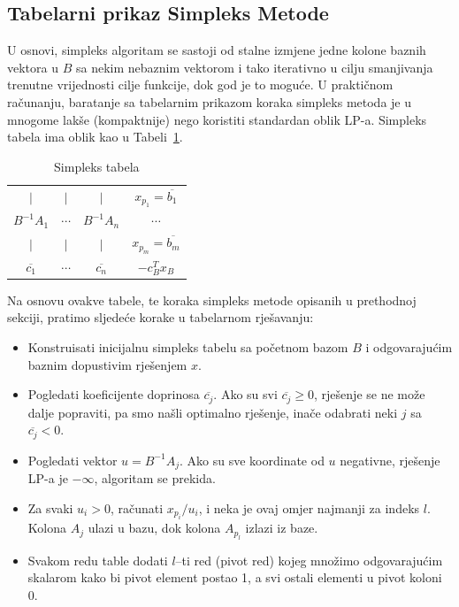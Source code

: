 \documentclass[a4paper, utf8, 11pt, colorlinks]{article}
\begin{document}
\subsection{Tabelarni prikaz Simpleks Metode}

U osnovi, simpleks algoritam se sastoji od stalne izmjene jedne kolone baznih vektora u $B$ sa nekim nebaznim vektorom i tako iterativno u cilju smanjivanja trenutne vrijednosti cilje funkcije, dok god je to moguće. 
U praktičnom računanju, baratanje sa tabelarnim prikazom koraka simpleks metoda je u mnogome lakše (kompaktnije) nego koristiti standardan oblik LP-a. 
Simpleks tabela ima oblik kao u Tabeli~\ref{tab:simplex_tabelau}. 

\begin{table}[!ht]
    \centering
    \begin{tabular}{c c c | c} \\ \hline
            $\mid$          &       $\mid$ &  $\mid$             &    $x_{p_1} = \overline{b_1}$         \\
          $B^{-1}A_1$       &    $\cdots$    &  $B^{-1}A_n$      &    $\cdots$          \\
            $\mid$          &       $\mid$ &  $\mid$             &   $ x_{p_m} = \overline{b_m}$         \\ \hline
          $\overline{c_1}$  &    $\cdots$    & $\overline{c_n}$  &  $-c^T_B x_B$         \\ \hline
    \end{tabular}
    \caption{Simpleks tabela}
    \label{tab:simplex_tabelau}
\end{table}

Na osnovu ovakve tabele, te koraka simpleks metode opisanih u prethodnoj sekciji, pratimo sljedeće korake u tabelarnom rješavanju:
\begin{itemize}
    \item Konstruisati inicijalnu simpleks tabelu sa početnom bazom $B$ i odgovarajućim baznim dopustivim rješenjem $x$.
    \item Pogledati koeficijente doprinosa $\overline{c_j}$. Ako su svi $\overline{c_j} \geq 0$, rješenje se ne može dalje popraviti, pa smo našli optimalno rješenje, inače odabrati neki $j$ sa $\overline{c_j}<0$.
    \item Pogledati vektor $u = B^{-1}A_j$. Ako su sve koordinate od $u$ negativne, rješenje LP-a je $-\infty$, algoritam se prekida.
    \item Za svaki $u_i > 0$, računati $x_{p_i}/u_i$, i neka je ovaj omjer najmanji za indeks $l$. Kolona $A_{j}$ ulazi u bazu, dok kolona $A_{p_l}$ izlazi iz baze. 
    \item Svakom redu table dodati $l$--ti red (pivot red) kojeg množimo odgovarajućim
         skalarom kako bi pivot element postao 1, a svi ostali elementi u pivot koloni 0.
\end{itemize}
\end{document}
